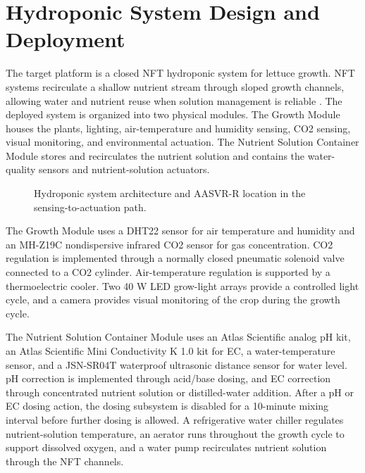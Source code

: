 \documentclass[preprint,12pt,doubleblind]{elsarticle}
\begin{document}
\section{Hydroponic System Design and Deployment}
The target platform is a closed NFT hydroponic system for lettuce growth. NFT systems recirculate a shallow nutrient stream through sloped growth channels, allowing water and nutrient reuse when solution management is reliable \cite{niu2022hydroponics,asaduzzaman2022nutrients}. The deployed system is organized into two physical modules. The Growth Module houses the plants, lighting, air-temperature and humidity sensing, CO2 sensing, visual monitoring, and environmental actuation. The Nutrient Solution Container Module stores and recirculates the nutrient solution and contains the water-quality sensors and nutrient-solution actuators.

\begin{figure}[!htbp]
\centering
\resizebox{0.98\linewidth}{!}{}
\caption{Hydroponic system architecture and AASVR-R location in the sensing-to-actuation path.}
\label{fig:hydro_system}
\end{figure}

The Growth Module uses a DHT22 sensor for air temperature and humidity and an MH-Z19C nondispersive infrared CO2 sensor for gas concentration. CO2 regulation is implemented through a normally closed pneumatic solenoid valve connected to a CO2 cylinder. Air-temperature regulation is supported by a thermoelectric cooler. Two 40 W LED grow-light arrays provide a controlled light cycle, and a camera provides visual monitoring of the crop during the growth cycle.

The Nutrient Solution Container Module uses an Atlas Scientific analog pH kit, an Atlas Scientific Mini Conductivity K 1.0 kit for EC, a water-temperature sensor, and a JSN-SR04T waterproof ultrasonic distance sensor for water level. pH correction is implemented through acid/base dosing, and EC correction through concentrated nutrient solution or distilled-water addition. After a pH or EC dosing action, the dosing subsystem is disabled for a 10-minute mixing interval before further dosing is allowed. A refrigerative water chiller regulates nutrient-solution temperature, an aerator runs throughout the growth cycle to support dissolved oxygen, and a water pump recirculates nutrient solution through the NFT channels.
\end{document}
